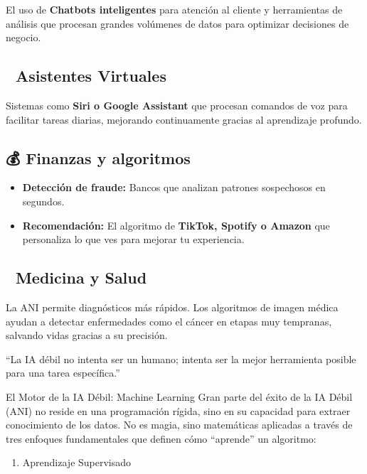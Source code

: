 \documentclass[
  spanish,
  letterpaper,
  DIV=11,
  numbers=noendperiod,
  oneside]{scrreprt}
\providecommand{\tightlist}{%
  \setlength{\itemsep}{0pt}\setlength{\parskip}{0pt}}
\begin{document}
El uso de \textbf{Chatbots inteligentes} para atención al cliente y
herramientas de análisis que procesan grandes volúmenes de datos para
optimizar decisiones de negocio.

\subsection{📱 Asistentes Virtuales}\label{asistentes-virtuales}

Sistemas como \textbf{Siri o Google Assistant} que procesan comandos de
voz para facilitar tareas diarias, mejorando continuamente gracias al
aprendizaje profundo.

\subsection{💰 Finanzas y algoritmos}\label{finanzas-y-algoritmos}

\begin{itemize}
\tightlist
\item
  \textbf{Detección de fraude:} Bancos que analizan patrones sospechosos
  en segundos.
\item
  \textbf{Recomendación:} El algoritmo de \textbf{TikTok, Spotify o
  Amazon} que personaliza lo que ves para mejorar tu experiencia.
\end{itemize}

\subsection{🏥 Medicina y Salud}\label{medicina-y-salud}

La ANI permite diagnósticos más rápidos. Los algoritmos de imagen médica
ayudan a detectar enfermedades como el cáncer en etapas muy tempranas,
salvando vidas gracias a su precisión.

``La IA débil no intenta ser un humano; intenta ser la mejor herramienta
posible para una tarea específica.''

El Motor de la IA Débil: Machine Learning Gran parte del éxito de la IA
Débil (ANI) no reside en una programación rígida, sino en su capacidad
para extraer conocimiento de los datos. No es magia, sino matemáticas
aplicadas a través de tres enfoques fundamentales que definen cómo
``aprende'' un algoritmo:

\begin{enumerate}
\def\labelenumi{\arabic{enumi}.}
\tightlist
\item
  Aprendizaje Supervisado
\end{enumerate}
\end{document}
